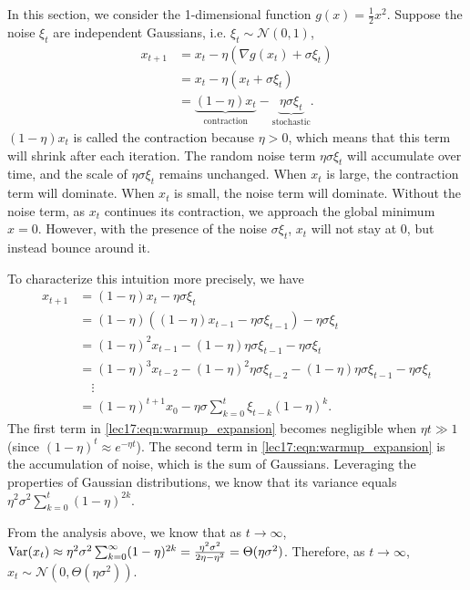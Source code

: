 In this section, we consider the 1-dimensional function $g(x) = \frac{1}{2} x^2$. Suppose the noise $\xi_t$ are independent Gaussians, i.e. $\xi_t \sim \mathcal{N}(0,1)$,
\begin{align}
x_{t+1} &= x_t - \eta(\nabla g(x_{t}) + \sigma\xi_t)\\
&= x_t - \eta(x_{t} + \sigma\xi_t)\\
&= \underbrace{(1 - \eta)x_t}_{\text{contraction}} - \underbrace{\eta\sigma\xi_t}_{\text{stochastic}}\label{lec17:eqn:ou}.
\end{align}
$(1 - \eta)x_t$ is called the contraction because $\eta > 0$, which means that this term will shrink after each iteration. The random noise term $\eta\sigma\xi_t$ will accumulate over time, and the scale of $\eta\sigma\xi_t$ remains unchanged. When $x_t$ is large, the contraction term will dominate. When $x_t$ is small, the noise term will dominate. Without the noise term, as $x_t$ continues its contraction, we approach the global minimum $x = 0$. However, with the presence of the noise $\sigma\xi_t$, $x_t$ will not stay at $0$, but instead bounce around it. 

To characterize this intuition more precisely, we have 
\begin{align}
x_{t+1} &= (1 - \eta)x_t - \eta\sigma\xi_t\\
&= (1 - \eta) ((1 - \eta) x_{t - 1}  - \eta \sigma \xi_{t - 1}) - \eta \sigma \xi_t \\
&= (1 - \eta)^2 x_{t - 1} - (1 - \eta) \eta \sigma \xi_{t - 1} - \eta \sigma \xi_{t} \\
&= (1 - \eta)^3 x_{t - 2} - (1 - \eta)^2 \eta \sigma \xi_{t - 2} - (1 - \eta) \eta \sigma \xi_{t - 1} - \eta \sigma \xi_t \\
&\quad \vdots \\
&= (1 - \eta)^{t+1} x_0 - \eta\sigma\sum_{k=0}^{t} \xi_{t-k} (1 - \eta)^{k}. \label{lec17:eqn:warmup_expansion}
\end{align}
The first term in \eqref{lec17:eqn:warmup_expansion} becomes negligible when $\eta t \gg 1$ (since $(1 - \eta)^{t} \approx e^{-\eta t}$). The second term in \eqref{lec17:eqn:warmup_expansion} is the accumulation of noise, which is the sum of Gaussians. Leveraging the properties of Gaussian distributions, we know that its variance equals $\eta^2\sigma^2\sum_{k=0}^{t} (1 - \eta)^{2k}$.

From the analysis above, we know that as $t \rightarrow \infty$, $\operatorname{Var}(x_t) \approx \eta^2\sigma^2\sum_{k=0}^{\infty} (1 - \eta)^{2k} = \frac{\eta^2\sigma^2}{2\eta - \eta^2} = {\Theta}(\eta\sigma^2)$. Therefore, as $t \rightarrow \infty$, $x_t \sim \mathcal{N}(0, {\Theta}(\eta\sigma^2))$.

